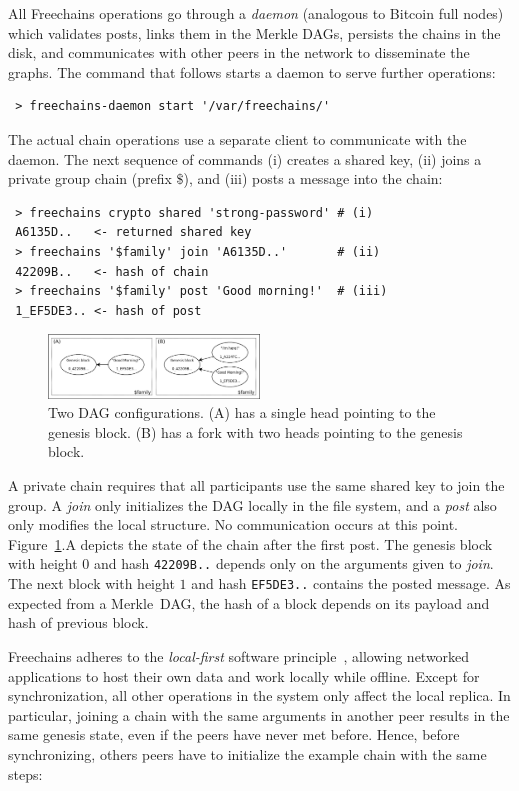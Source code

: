 \documentclass[10pt,journal,compsoc]{IEEEtran}
\newcommand{\FC}       {Freechains\xspace}
\begin{document}
All \FC operations go through a \emph{daemon} (analogous to Bitcoin full nodes)
which validates posts, links them in the Merkle DAGs, persists the chains in
the disk, and communicates with other peers in the network to disseminate the
graphs.
The command that follows starts a daemon to serve further operations:

{\footnotesize
\begin{verbatim}
 > freechains-daemon start '/var/freechains/'
\end{verbatim}
}

The actual chain operations use a separate client to communicate with the
daemon.
The next sequence of commands (i) creates a shared key, (ii) joins a private
group chain (prefix $\$$), and (iii) posts a message into the chain:

{\footnotesize
\begin{verbatim}
 > freechains crypto shared 'strong-password' # (i)
 A6135D..   <- returned shared key
 > freechains '$family' join 'A6135D..'       # (ii)
 42209B..   <- hash of chain
 > freechains '$family' post 'Good morning!'  # (iii)
 1_EF5DE3.. <- hash of post
\end{verbatim}
}

\begin{figure}
\centering
\includegraphics[width=0.5\textwidth]{family.png}
\caption{Two DAG configurations. (A) has a single head pointing to the
genesis block. (B) has a fork with two heads pointing to the genesis block.}
\label{fig.family}
\end{figure}

A private chain requires that all participants use the same shared key to join
the group.
A \emph{join} only initializes the DAG locally in the file system, and a
\emph{post} also only modifies the local structure.
No communication occurs at this point.
Figure~\ref{fig.family}.A depicts the state of the chain after the first post.
The genesis block with height $0$ and hash \texttt{42209B..}
depends only on the arguments given to \emph{join}.
The next block with height $1$ and hash \texttt{EF5DE3..} contains the posted
message.
As expected from a Merkle~DAG, the hash of a block depends on its payload and
hash of previous block.

\FC adheres to the \emph{local-first} software principle~\cite{p2p.local},
allowing networked applications to host their own data and work locally while
offline.
Except for synchronization, all other operations in the system only affect the
local replica.
In particular, joining a chain with the same arguments in another peer results
in the same genesis state, even if the peers have never met before.
Hence, before synchronizing, others peers have to initialize the example chain
with the same steps:
\end{document}
